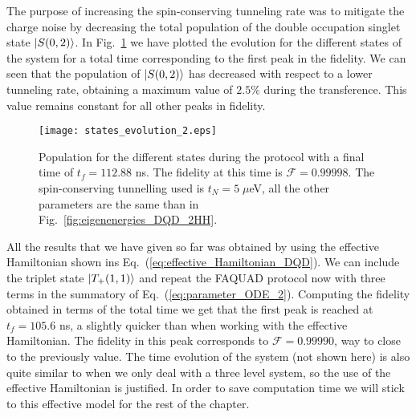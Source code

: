 The purpose of increasing the spin-conserving tunneling rate was to mitigate the charge noise by decreasing the total population of the double occupation singlet state $\ket{S(0,2)}$. In Fig.~\ref{fig:states_evolution_2} we have plotted the evolution for the different states of the system for a total time corresponding to the first peak in the fidelity. We can seen that the population of $\ket{S(0,2)}$ has decreased with respect to a lower tunneling rate, obtaining a maximum value of $2.5\%$ during the transference. This value remains constant for all other peaks in fidelity.
\begin{figure}[!htb]
	\centering
	\texttt{[image: states\_evolution\_2.eps]}
	\caption{Population for the different states during the protocol with a final time of $t_f=112.88$ ns. The fidelity at this time is $\mathcal{F}=0.99998$. The spin-conserving tunnelling used is $t_N=5\; \mu$eV, all the other parameters are the same than in Fig.~\ref{fig:eigenenergies_DQD_2HH}.}
	\label{fig:states_evolution_2}
\end{figure}

All the results that we have given so far was obtained by using the effective Hamiltonian shown ins Eq.~(\ref{eq:effective_Hamiltonian_DQD}). We can include the triplet state $\ket{T_+(1,1)}$ and repeat the FAQUAD protocol now with three terms in the summatory of Eq.~(\ref{eq:parameter_ODE_2}). Computing the fidelity obtained in terms of the total time we get that the first peak is reached at $t_f=105.6$ ns, a slightly quicker than when working with the effective Hamiltonian. The fidelity in this peak corresponds to $\mathcal{F}=0.99990$, way to close to the previously value. The time evolution of the system (not shown here) is also quite similar to when we only deal with a three level system, so the use of the effective Hamiltonian is justified. In order to save computation time we will stick to this effective model for the rest of the chapter.


